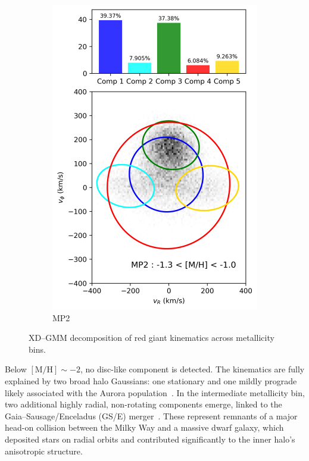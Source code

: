 \documentclass[a4paper,10pt]{article}
\begin{document}
\begin{multicols}{2}
\begin{figure}[H]
\begin{subfigure}[t]{0.24\linewidth}
    \includegraphics[width=\linewidth]{../figures/gmm_MP2.png}
    \caption{MP2}
    \label{fig:gmm_mp2}
  \end{subfigure}

  \caption{XD–GMM decomposition of red giant kinematics across metallicity bins.}
  \label{fig:gmm_zhang}
\end{figure}

Below $\mathrm{[M/H]} \sim -2$, no disc-like component is detected. The kinematics are fully 
explained by two broad halo Gaussians: one stationary and one mildly prograde likely associated 
with the Aurora population~\cite{Belokurov2022}. In the intermediate metallicity bin, two 
additional highly radial, non-rotating components emerge, linked to the 
Gaia–Sausage/Enceladus (GS/E) merger~\cite{Belokurov2018}. These represent remnants of a 
major head-on collision between the Milky Way and a massive dwarf galaxy, which deposited stars 
on radial orbits and contributed significantly to the inner halo's anisotropic structure.


\end{multicols}
\end{document}
